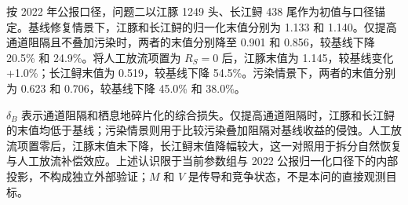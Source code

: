 按 2022 年公报口径，问题二以江豚 1249 头、长江鲟 438 尾作为初值与口径锚定。基线修复情景下，江豚和长江鲟的归一化末值分别为 1.133 和 1.140。仅提高通道阻隔且不叠加污染时，两者的末值分别降至 0.901 和 0.856，较基线下降 20.5\% 和 24.9\%。将人工放流项置为 \(R_S=0\) 后，江豚末值为 1.145，较基线变化 +1.0\%；长江鲟末值为 0.519，较基线下降 54.5\%。污染情景下，两者的末值分别为 0.623 和 0.706，较基线下降 45.0\% 和 38.0\%。

\(\delta_B\) 表示通道阻隔和栖息地碎片化的综合损失。仅提高通道阻隔时，江豚和长江鲟的末值均低于基线；污染情景则用于比较污染叠加阻隔对基线收益的侵蚀。人工放流项置零后，江豚末值未下降，长江鲟末值降幅较大，这一对照用于拆分自然恢复与人工放流补偿效应。上述认识限于当前参数组与 2022 公报归一化口径下的内部投影，不构成独立外部验证；\(M\) 和 \(V\) 是传导和竞争状态，不是本问的直接观测目标。
